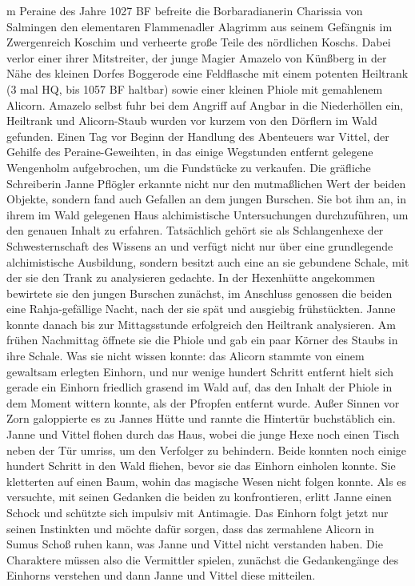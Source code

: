 
m Peraine des Jahre 1027 BF befreite die Borbaradianerin Charissia von Salmingen den elementaren Flammenadler Alagrimm aus seinem Gefängnis im Zwergenreich Koschim und verheerte große Teile des nördlichen Koschs. Dabei verlor einer ihrer Mitstreiter, der junge Magier Amazelo von Künßberg in der Nähe des kleinen Dorfes Boggerode eine Feldflasche mit einem potenten Heiltrank (3 mal HQ, bis 1057 BF haltbar) sowie einer kleinen Phiole mit gemahlenem Alicorn. Amazelo selbst fuhr bei dem Angriff auf Angbar in die Niederhöllen ein, Heiltrank und Alicorn-Staub wurden vor kurzem von den Dörflern im Wald gefunden. Einen Tag vor Beginn der Handlung des Abenteuers war Vittel, der Gehilfe des Peraine-Geweihten, in das einige Wegstunden entfernt gelegene Wengenholm aufgebrochen, um die Fundstücke zu verkaufen. Die gräfliche Schreiberin Janne Pflögler erkannte nicht nur den mutmaßlichen Wert der beiden Objekte, sondern fand auch Gefallen an dem jungen Burschen. Sie bot ihm an, in ihrem im Wald gelegenen Haus alchimistische Untersuchungen durchzuführen, um den genauen Inhalt zu erfahren. Tatsächlich gehört sie als Schlangenhexe der Schwesternschaft des Wissens an und verfügt nicht nur über eine grundlegende alchimistische Ausbildung, sondern besitzt auch eine an sie gebundene Schale, mit der sie den Trank zu analysieren gedachte.
\platz
In der Hexenhütte angekommen bewirtete sie den jungen Burschen zunächst, im Anschluss genossen die beiden eine Rahja-gefällige Nacht, nach der sie spät und 
ausgiebig frühstückten. Janne konnte danach bis zur Mittagsstunde erfolgreich den Heiltrank analysieren. Am frühen Nachmittag öffnete sie die Phiole und gab ein paar Körner des Staubs in ihre Schale. Was sie nicht wissen konnte: das Alicorn stammte von einem gewaltsam erlegten Einhorn, und nur wenige hundert Schritt entfernt hielt sich gerade ein Einhorn friedlich grasend im Wald auf, das den Inhalt der Phiole in dem Moment wittern konnte, als der Pfropfen entfernt wurde. Außer Sinnen vor Zorn galoppierte es zu Jannes Hütte und rannte die Hintertür buchstäblich ein. Janne und Vittel flohen durch das Haus, wobei die junge Hexe noch einen Tisch neben der Tür umriss, um den Verfolger zu behindern. Beide konnten noch einige hundert Schritt in den Wald fliehen, bevor sie das Einhorn einholen konnte. Sie kletterten auf einen Baum, wohin das magische Wesen nicht folgen konnte. Als es versuchte, mit seinen Gedanken die beiden zu konfrontieren, erlitt Janne einen Schock und schützte sich impulsiv mit Antimagie. Das Einhorn folgt jetzt nur seinen Instinkten und möchte dafür sorgen, dass das zermahlene Alicorn in Sumus Schoß ruhen kann, was Janne und Vittel nicht verstanden haben. Die Charaktere müssen also die Vermittler spielen, zunächst die Gedankengänge des Einhorns verstehen und dann Janne und Vittel diese mitteilen.
